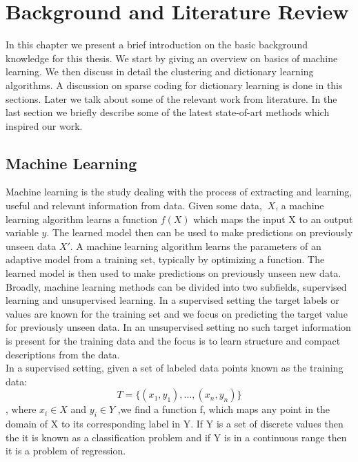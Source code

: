 
\chapter{Background and Literature Review}

\ifpdf
\graphicspath{{Chapter2/Figs/Raster/}{Chapter2/Figs/PDF/}{Chapter2/Figs/}}
\else
\graphicspath{{Chapter2/Figs/Vector/}{Chapter2/Figs/}}
\fi

In this chapter we present a brief introduction on the basic background knowledge for this thesis. We start by giving an overview on basics of machine learning. We then discuss in detail the clustering and dictionary learning algorithms. A discussion on sparse coding for dictionary learning is done in this sections. Later we talk about some of the relevant work from literature. In the last section we briefly describe some of the latest state-of-art methods which inspired our work.
\section[Machine Learning]{Machine Learning}

Machine learning is the study dealing with the process of extracting and learning, useful and relevant information from data. Given some data, $\ X $, a machine learning algorithm learns a function $ f(X) $ which maps the input X to an output variable $y$. The learned model then can be used to make predictions on previously unseen data $X'$. A machine learning algorithm learns the parameters of an adaptive model from a training set, typically by optimizing a function. The learned model is then used to make predictions on previously unseen new data. Broadly, machine learning methods can be divided into two subfields, supervised learning and unsupervised learning. In a supervised setting the target labels or values are known for the training set and we focus on predicting the target value for previously unseen data. In an unsupervised setting no such target information is present for the training data and the focus is to learn structure and compact descriptions from the data.\\

In a supervised setting, given a set of labeled  data points known as the training data: $$ T = \{(x_1,y_1),...,(x_n,y_n)\} $$, where $x_i \in X$ and $y_i \in Y$ ,we find a function f, which maps any point in the domain of X to its corresponding label in Y. If Y is a set of discrete values then the it is known as a classification problem and if Y is in a continuous range then it is a problem of regression.\\

